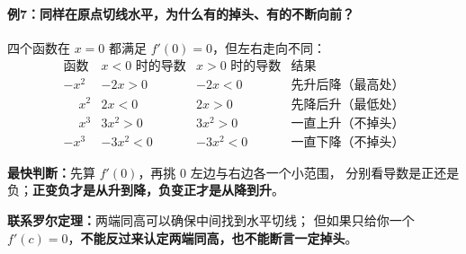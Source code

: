 \clearpage
\begin{examplebox}
\paragraph{例7：同样在原点切线水平，为什么有的掉头、有的不断向前？}

四个函数在 $x=0$ 都满足 $f'(0)=0$，但左右走向不同：
\[
\begin{array}{c|c|c|c}
\text{函数}&x<0\text{ 时的导数}&x>0\text{ 时的导数}&\text{结果}\\ \hline
-x^2&-2x>0&-2x<0&\text{先升后降（最高处）}\\
\phantom{-}x^2&2x<0&2x>0&\text{先降后升（最低处）}\\
\phantom{-}x^3&3x^2>0&3x^2>0&\text{一直上升（不掉头）}\\
-x^3&-3x^2<0&-3x^2<0&\text{一直下降（不掉头）}
\end{array}
\]

\textbf{最快判断：}先算 $f'(0)$，再挑 $0$ 左边与右边各一个小范围，
分别看导数是正还是负；\textbf{正变负才是从升到降，负变正才是从降到升}。

\textbf{联系罗尔定理：}两端同高可以确保中间找到水平切线；
但如果只给你一个 $f'(c)=0$，\textbf{不能反过来认定两端同高，也不能断言一定掉头}。
\end{examplebox}

